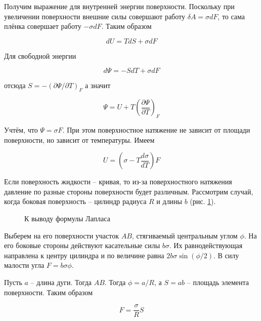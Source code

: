 Получим выражение для внутренней энергии поверхности. Поскольку при увеличении поверхности внешние силы совершают работу $\delta A = \sigma dF$, то сама плёнка совершает работу $- \sigma dF$. Таким образом

\begin{equation*}
    dU = T dS + \sigma dF
\end{equation*}

\noindent
Для свободной энергии

\begin{equation*}
    d \Psi = - S dT + \sigma dF
\end{equation*}

\noindent
отсюда $S = - \left( \partial \Psi / \partial T \right)_F$ а значит

\begin{equation}
    \Psi = U + T \left( \frac{\partial \Psi}{\partial T} \right)_F
\end{equation}

\noindent
Учтём, что $\Psi = \sigma F$. При этом поверхностное натяжение не зависит от площади поверхности, но зависит от температуры. Имеем

\begin{equation}
    U = \left( \sigma - T \frac{d \sigma}{dT} \right) F
\end{equation}

Если поверхность жидкости -- кривая, то из-за поверхностного натяжения давление по разные стороны поверхности будет различным. Рассмотрим случай, когда боковая поверхность -- цилиндр радиуса $R$ и длины $b$ (рис. \ref{fig:формула лапласа}).

\begin{figure}[htbp]
    \centering
    
    \caption{К выводу формулы Лапласа}
    \label{fig:формула лапласа}
\end{figure}

Выберем на его поверхности участок $AB$, стягиваемый центральным углом $\phi$. На его боковые стороны действуют касательные силы $b \sigma$. Их равнодействующая направлена к центру цилиндра и по величине равна $2 b \sigma \sin (\phi / 2)$. В силу малости угла $F = b \sigma \phi$.

Пусть $a$ -- длина дуги. Тогда $AB$. Тогда $\phi = a / R$, а $S = a b$ -- площадь элемента поверхности. Таким образом

\begin{equation*}
    F = \frac{\sigma}{R} S
\end{equation*}

